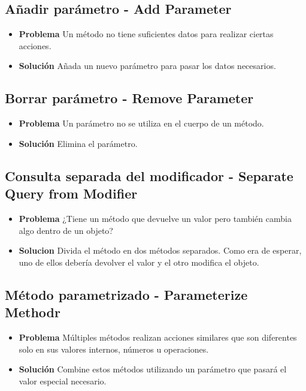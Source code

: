 \documentclass[11pt,a4paper,oneside]{book}
\begin{document}
\subsection{Añadir parámetro - Add Parameter}
\label{anadirparametro}
\begin{itemize}
    \item \textbf{Problema} Un método no tiene suficientes datos para realizar ciertas acciones.
    \item \textbf{Solución} Añada un nuevo parámetro para pasar los datos necesarios.
\end{itemize}
    
\subsection{Borrar parámetro - Remove Parameter}
\label{borrarparametro}
\begin{itemize}
    \item \textbf{Problema} Un parámetro no se utiliza en el cuerpo de un método.
    \item \textbf{Solución} Elimina el parámetro.
\end{itemize}

\subsection{Consulta separada del modificador - Separate Query from Modifier}
\label{consultaseparadamodificador}
\begin{itemize}
    \item \textbf{Problema} ¿Tiene un método que devuelve un valor pero también cambia algo dentro de un objeto?
    \item \textbf{Solucion} Divida el método en dos métodos separados. Como era de esperar, uno de ellos debería devolver el valor y el otro modifica el objeto.
\end{itemize}

\subsection{Método parametrizado - Parameterize Methodr}
\label{metodoparametrizado}
\begin{itemize}
    \item \textbf{Problema} Múltiples métodos realizan acciones similares que son diferentes solo en sus valores internos, números u operaciones.
    \item \textbf{Solución} Combine estos métodos utilizando un parámetro que pasará el valor especial necesario.
\end{itemize}
\end{document}
